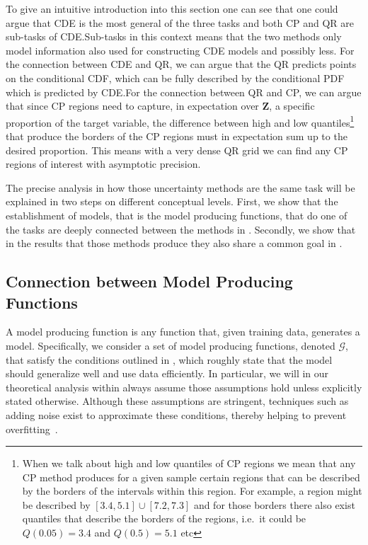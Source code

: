 To give an intuitive introduction into this section one can see that one could argue that CDE is the most general of the three tasks and both CP and QR are sub-tasks of CDE.\@ Sub-tasks in this context means that the two methods only model information also used for constructing CDE models and possibly less. For the connection between CDE and QR, we can argue that the QR predicts points on the conditional CDF, which can be fully described by the conditional PDF which is predicted by CDE.\@ For the connection between QR and CP, we can argue that since CP regions need to capture, in expectation over $\mathbf{Z}$, a specific proportion of the target variable, the difference between high and low quantiles\footnote{When we talk about high and low quantiles of CP regions we mean that any CP method produces for a given sample certain regions that can be described by the borders of the intervals within this region. For example, a region might be described by $[3.4, 5.1] \cup [7.2, 7.3]$ and for those borders there also exist quantiles that describe the borders of the regions, i.e.\ it could be $Q(0.05) = 3.4$ and $Q(0.5) = 5.1$ etc} that produce the borders of the CP regions must in expectation sum up to the desired proportion. This means with a very dense QR grid we can find any CP regions of interest with asymptotic precision.

The precise analysis in how those uncertainty methods are the same task will be explained in two steps on different conceptual levels. First, we show that the establishment of models, that is the model producing functions, that do one of the tasks are deeply connected between the methods in . Secondly, we show that in the results that those methods produce they also share a common goal in .

\subsection{Connection between Model Producing Functions}\label{sec:connection_model_producing}

A model producing function is any function that, given training data, generates a model. Specifically, we consider a set of model producing functions, denoted $\mathcal{G}$, that satisfy the conditions outlined in , which roughly state that the model should generalize well and use data efficiently. In particular, we will in our theoretical analysis within  always assume those assumptions hold unless explicitly stated otherwise. Although these assumptions are stringent, techniques such as adding noise exist to approximate these conditions, thereby helping to prevent overfitting~\cite{rothfuss2019noise}.

